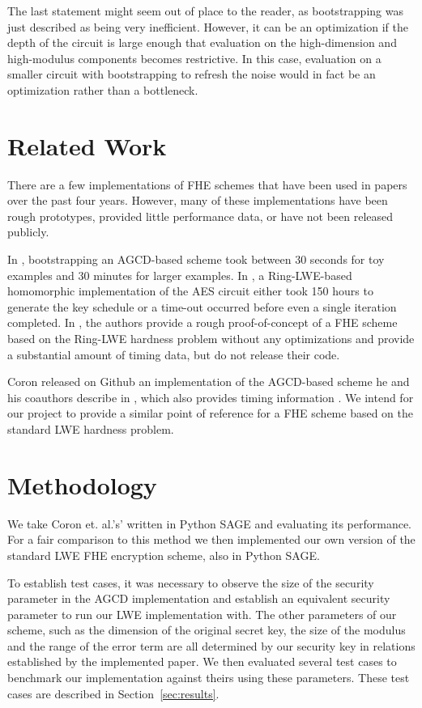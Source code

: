 \documentclass[letterpaper,twocolumn,10pt]{article}
\begin{document}
The last statement might seem out of place to the reader, as bootstrapping was just described as being very inefficient. However, it can be an optimization if the depth of the circuit is large enough that evaluation on the high-dimension and high-modulus components becomes restrictive. In this case, evaluation on a smaller circuit with bootstrapping to refresh the noise would in fact be an optimization rather than a bottleneck.


\section{Related Work}
There are a few implementations of FHE schemes that have been used in papers over the past four years. However, many of these implementations have been rough prototypes, provided little performance data, or have not been released publicly. 

In \cite{ImplementingGentry}, bootstrapping an AGCD-based scheme took between 30 seconds for toy examples and 30 minutes for larger examples. In \cite{AES}, a Ring-LWE-based homomorphic implementation of the AES circuit either took 150 hours to generate the key schedule or a time-out occurred before even a single iteration completed. In \cite{Practical}, the authors provide a rough proof-of-concept of a FHE scheme based on the Ring-LWE hardness problem without any optimizations and provide a substantial amount of timing data, but do not release their code.

Coron released on Github an implementation of the AGCD-based scheme he and his coauthors describe in \cite{CNT}, which also provides timing information \cite{Coron}. We intend for our project to provide a similar point of reference for a FHE scheme based on the standard LWE hardness problem.



\section{Methodology}
We take Coron et. al.'s' written in Python SAGE and evaluating its performance. For a fair comparison to this method we then implemented our own version of the standard LWE FHE encryption scheme, also in Python SAGE.

To establish test cases, it was necessary to observe the size of the security parameter in the AGCD implementation and establish an equivalent security parameter to run our LWE implementation with. The other parameters of our scheme, such as the dimension of the original secret key, the size of the modulus and the range of the error term are all determined by our security key in relations established by the implemented paper\cite{StandardLWE}. We then evaluated several test cases to benchmark our implementation against theirs using these parameters. These test cases are described in Section~\ref{sec:results}.
\end{document}
